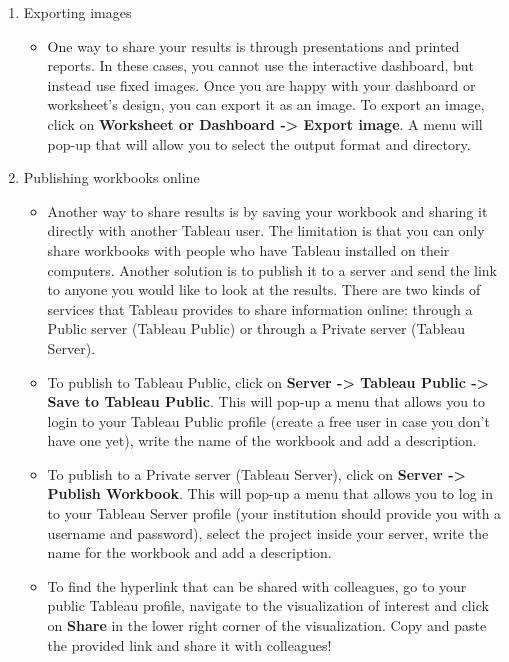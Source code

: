 \documentclass[
]{book}
\providecommand{\tightlist}{%
  \setlength{\itemsep}{0pt}\setlength{\parskip}{0pt}}
\begin{document}
\begin{enumerate}
\def\labelenumi{\arabic{enumi}.}
\tightlist
\item
  Exporting images

  \begin{itemize}
  \tightlist
  \item
    One way to share your results is through presentations and printed reports. In these cases, you cannot use the interactive dashboard, but instead use fixed images. Once you are happy with your dashboard or worksheet's design, you can export it as an image. To export an image, click on \textbf{Worksheet or Dashboard -\textgreater{} Export image}. A menu will pop-up that will allow you to select the output format and directory.
  \end{itemize}
\item
  Publishing workbooks online

  \begin{itemize}
  \tightlist
  \item
    Another way to share results is by saving your workbook and sharing it directly with another Tableau user. The limitation is that you can only share workbooks with people who have Tableau installed on their computers. Another solution is to publish it to a server and send the link to anyone you would like to look at the results. There are two kinds of services that Tableau provides to share information online: through a Public server (Tableau Public) or through a Private server (Tableau Server).
  \item
    To publish to Tableau Public, click on \textbf{Server -\textgreater{} Tableau Public -\textgreater{} Save to Tableau Public}. This will pop-up a menu that allows you to login to your Tableau Public profile (create a free user in case you don't have one yet), write the name of the workbook and add a description.
  \item
    To publish to a Private server (Tableau Server), click on \textbf{Server -\textgreater{} Publish Workbook}. This will pop-up a menu that allows you to log in to your Tableau Server profile (your institution should provide you with a username and password), select the project inside your server, write the name for the workbook and add a description.
  \item
    To find the hyperlink that can be shared with colleagues, go to your public Tableau profile, navigate to the visualization of interest and click on \textbf{Share} in the lower right corner of the visualization. Copy and paste the provided link and share it with colleagues!
  \end{itemize}
\end{enumerate}
\end{document}
